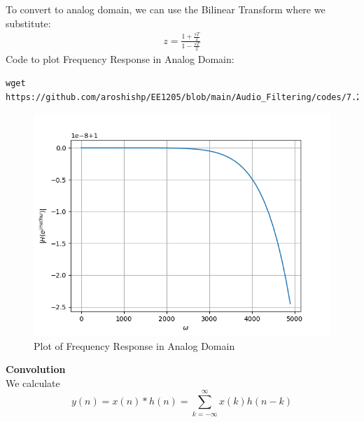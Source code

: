 \documentclass[journal,12pt,twocolumn]{IEEEtran}
\theoremstyle{remark}
\renewcommand\thesection{\arabic{section}}
\numberwithin{equation}{subsection}
\begin{document}
\begin{enumerate}[label=\thesection.\arabic*]
To convert to analog domain, we can use the Bilinear Transform where we substitute:
\begin{align}
    z=\frac{1+\frac{sT}{2}}{{1-\frac{sT}{2}}}
\end{align}
Code to plot Frequency Response in Analog Domain:
\begin{lstlisting}
wget https://github.com/aroshishp/EE1205/blob/main/Audio_Filtering/codes/7.2bt.py
\end{lstlisting}
\begin{figure}[!h]
    \centering
    \includegraphics[width = \columnwidth]{figs/7.2bt.png}
    \caption{Plot of Frequency Response in Analog Domain}
    \label{fig:7.2bt}
\end{figure}

\textbf{Convolution}\\
We calculate
\begin{equation}
    y(n) = x(n)*h(n) = \sum_{k=-\infty}^{\infty}x(k)h(n-k) 
\end{equation}


\end{enumerate}
\end{document}
